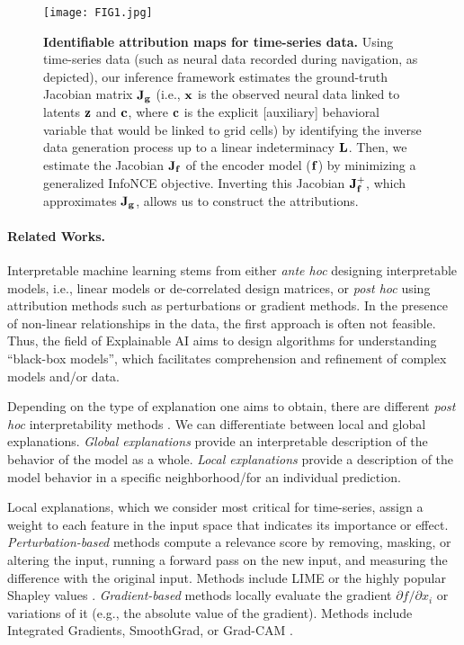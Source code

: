     
\begin{figure*}[t]
        \centering
        \texttt{[image: FIG1.jpg]}
        \vspace{-5pt}
        \caption{\textbf{Identifiable attribution maps for time-series data.} Using time-series data (such as neural data recorded during navigation, as depicted), our inference framework estimates the ground-truth Jacobian matrix $\mathbf{J}_{\mathbf{g}}$ (i.e., $\mathbf{x}$ is the observed neural data linked to latents $\mathbf{z}$ and $\mathbf{c}$, where $\mathbf{c}$ is the explicit [auxiliary] behavioral variable that would be linked to grid cells) by identifying the inverse data generation process up to a linear indeterminacy $\mathbf{L}$. Then, we estimate the Jacobian $\mathbf{J}_{\mathbf{f}}$ of the encoder model ($\mathbf{f}$) by minimizing a generalized InfoNCE objective. Inverting this Jacobian $\mathbf{J}_{\mathbf{f}}^+$, which approximates $\mathbf{J}_{\mathbf{g}}$, allows us to construct the attributions.
        }
        \label{fig:fig1}
        \vspace{-7pt}
    \end{figure*}

\vspace{-10pt}
\paragraph{Related Works.}

Interpretable machine learning stems from either \textit{ante hoc} designing interpretable models, i.e., linear models or de-correlated design matrices, or \textit{post hoc} using attribution methods such as perturbations or gradient methods. In the presence of non-linear relationships in the data, the first approach is often not feasible. Thus, the field of Explainable AI aims to design algorithms for understanding ``black-box models'', which facilitates comprehension and refinement of complex models and/or data.

Depending on the type of explanation one aims to obtain, there are different \textit{post hoc} interpretability methods \citep{samek2019explainable}. We can differentiate between local and global explanations. \emph{Global explanations} provide an interpretable description of the behavior of the model as a whole. \emph{Local explanations} provide a description of the model behavior in a specific neighborhood/for an individual prediction.

Local explanations, which we consider most critical for time-series, assign a weight to each feature in the input space that indicates its importance or effect.
\emph{Perturbation-based} methods compute a relevance score by removing, masking, or altering the input, running a forward pass on the new input, and measuring the difference with the original input. Methods include LIME or the highly popular Shapley values \citep{ribeiro2016should, lundberg2017unified}.
\emph{Gradient-based} methods locally evaluate the gradient $\partial{f} / \partial{x_i}$ or variations of it (e.g., the absolute value of the gradient). Methods include Integrated Gradients, SmoothGrad, or Grad-CAM \citep{Sundararajan2017AxiomaticAF, smilkov2017smoothgrad, selvaraju2017grad}.



